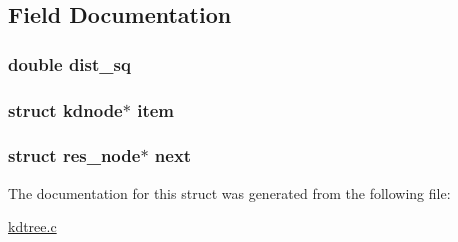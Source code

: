 \subsection{\-Field \-Documentation}
\hypertarget{a00012_ab5db408f198264d49229dc7119b5a259_ab5db408f198264d49229dc7119b5a259}{
\subsubsection[{dist\-\_\-sq}]{\setlength{\rightskip}{0pt plus 5cm}double {\bf dist\-\_\-sq}}}\label{df/d86/a00012_ab5db408f198264d49229dc7119b5a259_ab5db408f198264d49229dc7119b5a259}
\hypertarget{a00012_a9839da196515787759722e34b14a2d3f_a9839da196515787759722e34b14a2d3f}{
\subsubsection[{item}]{\setlength{\rightskip}{0pt plus 5cm}struct {\bf kdnode}$\ast$ {\bf item}}}\label{df/d86/a00012_a9839da196515787759722e34b14a2d3f_a9839da196515787759722e34b14a2d3f}
\hypertarget{a00012_a4a322132f093f66e895e0b5f5ee1bfea_a4a322132f093f66e895e0b5f5ee1bfea}{
\subsubsection[{next}]{\setlength{\rightskip}{0pt plus 5cm}struct {\bf res\-\_\-node}$\ast$ {\bf next}}}\label{df/d86/a00012_a4a322132f093f66e895e0b5f5ee1bfea_a4a322132f093f66e895e0b5f5ee1bfea}


\-The documentation for this struct was generated from the following file\-:\begin{DoxyCompactItemize}
\item 
\hyperlink{a00013}{kdtree.\-c}\end{DoxyCompactItemize}
